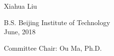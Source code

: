 \begin{titlepage}
\begin{center}
{        %
        \vspace{1cm}
        
        Xiahua Liu \\
        
        \vspace{2cm}
        }
        
        {\fontsize{12pt}{24pt}\selectfont
        
        B.S. Beijing Institute of Technology \\
        
        June, 2018 \\
        
        \vspace{1cm}
        
        Committee Chair: Ou Ma, Ph.D. \\
        }
        
        \vspace{0.8cm}
 
    \end{center}
\end{titlepage}